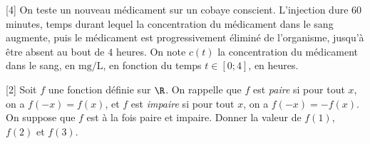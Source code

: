 \documentclass{exam}
\begin{document}
\begin{questions}
\vspace*{1cm}
[4]
On teste un nouveau médicament sur un cobaye conscient. L'injection dure $60$ minutes, temps durant lequel la concentration du médicament dans le sang augmente, puis le médicament est progressivement éliminé de l'organisme, jusqu'à être absent au bout de $4$ heures. On note $c(t)$ la concentration du médicament dans le sang, en $\si{\milli\gram\per\liter}$, en fonction du temps $t \in \left[0;4\right]$, en heures.
\vspace*{1cm}
[2]
Soit $f$ une fonction définie sur $\R$. On rappelle que $f$ est \emph{paire} si pour tout $x$, on a $f(-x)=f(x)$, et $f$ est \emph{impaire} si pour tout $x$, on a $f(-x)=-f(x)$. On suppose que $f$ est à la fois paire et impaire. Donner la valeur de $f(1)$, $f(2)$ et $f(3)$.
\end{questions}
\end{document}
